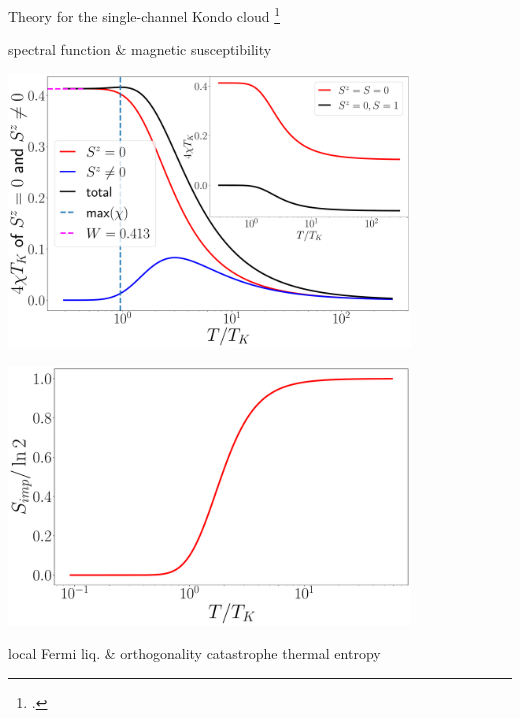 \documentclass[8pt,aspectratio=169]{beamer}
\begin{document}
\begin{frame}{Theory for the single-channel Kondo cloud}
\footcite{kondo1964resistance,wilson1975,andreiKondoreview,hewson1993,nozieres1974fermi,anderson1970,tsvelickKondoreview,affleck1993exact,Goldhaber-Gordon1998,Borzenets2020,sakai_osamu_shimizu,costi_hewson_1990,nozaki2012,affleck1995conformal}

\begin{minipage}{0.49\textwidth}
\centering
\begin{itemize}
\nitem spectral function \& magnetic susceptibility
\end{itemize}

\vspace*{10pt}

\includegraphics[width=0.8\textwidth]{chi_parts.pdf}
\end{minipage}
\begin{minipage}{0.49\textwidth}
\centering
\includegraphics[width=0.8\textwidth]{entropy_therm.pdf}

\vspace*{10pt}

\begin{itemize}
\nitem local Fermi liq. \& orthogonality catastrophe
\nitem thermal entropy
\end{itemize}
\end{minipage}

\end{frame}
\end{document}
